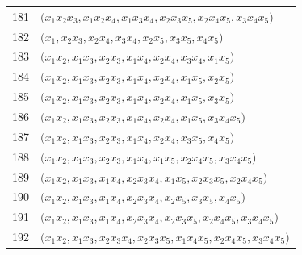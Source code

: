{\begin{longtable}{@{}r>{\raggedright\arraybackslash}p{}@{}}
181 & \(\bigl(x_{1}x_{2}x_{3},\allowbreak x_{1}x_{2}x_{4},\allowbreak x_{1}x_{3}x_{4},\allowbreak x_{2}x_{3}x_{5},\allowbreak x_{2}x_{4}x_{5},\allowbreak x_{3}x_{4}x_{5}\bigr)\) \\
182 & \(\bigl(x_{1},\allowbreak x_{2}x_{3},\allowbreak x_{2}x_{4},\allowbreak x_{3}x_{4},\allowbreak x_{2}x_{5},\allowbreak x_{3}x_{5},\allowbreak x_{4}x_{5}\bigr)\) \\
183 & \(\bigl(x_{1}x_{2},\allowbreak x_{1}x_{3},\allowbreak x_{2}x_{3},\allowbreak x_{1}x_{4},\allowbreak x_{2}x_{4},\allowbreak x_{3}x_{4},\allowbreak x_{1}x_{5}\bigr)\) \\
184 & \(\bigl(x_{1}x_{2},\allowbreak x_{1}x_{3},\allowbreak x_{2}x_{3},\allowbreak x_{1}x_{4},\allowbreak x_{2}x_{4},\allowbreak x_{1}x_{5},\allowbreak x_{2}x_{5}\bigr)\) \\
185 & \(\bigl(x_{1}x_{2},\allowbreak x_{1}x_{3},\allowbreak x_{2}x_{3},\allowbreak x_{1}x_{4},\allowbreak x_{2}x_{4},\allowbreak x_{1}x_{5},\allowbreak x_{3}x_{5}\bigr)\) \\
186 & \(\bigl(x_{1}x_{2},\allowbreak x_{1}x_{3},\allowbreak x_{2}x_{3},\allowbreak x_{1}x_{4},\allowbreak x_{2}x_{4},\allowbreak x_{1}x_{5},\allowbreak x_{3}x_{4}x_{5}\bigr)\) \\
187 & \(\bigl(x_{1}x_{2},\allowbreak x_{1}x_{3},\allowbreak x_{2}x_{3},\allowbreak x_{1}x_{4},\allowbreak x_{2}x_{4},\allowbreak x_{3}x_{5},\allowbreak x_{4}x_{5}\bigr)\) \\
188 & \(\bigl(x_{1}x_{2},\allowbreak x_{1}x_{3},\allowbreak x_{2}x_{3},\allowbreak x_{1}x_{4},\allowbreak x_{1}x_{5},\allowbreak x_{2}x_{4}x_{5},\allowbreak x_{3}x_{4}x_{5}\bigr)\) \\
189 & \(\bigl(x_{1}x_{2},\allowbreak x_{1}x_{3},\allowbreak x_{1}x_{4},\allowbreak x_{2}x_{3}x_{4},\allowbreak x_{1}x_{5},\allowbreak x_{2}x_{3}x_{5},\allowbreak x_{2}x_{4}x_{5}\bigr)\) \\
190 & \(\bigl(x_{1}x_{2},\allowbreak x_{1}x_{3},\allowbreak x_{1}x_{4},\allowbreak x_{2}x_{3}x_{4},\allowbreak x_{2}x_{5},\allowbreak x_{3}x_{5},\allowbreak x_{4}x_{5}\bigr)\) \\
191 & \(\bigl(x_{1}x_{2},\allowbreak x_{1}x_{3},\allowbreak x_{1}x_{4},\allowbreak x_{2}x_{3}x_{4},\allowbreak x_{2}x_{3}x_{5},\allowbreak x_{2}x_{4}x_{5},\allowbreak x_{3}x_{4}x_{5}\bigr)\) \\
192 & \(\bigl(x_{1}x_{2},\allowbreak x_{1}x_{3},\allowbreak x_{2}x_{3}x_{4},\allowbreak x_{2}x_{3}x_{5},\allowbreak x_{1}x_{4}x_{5},\allowbreak x_{2}x_{4}x_{5},\allowbreak x_{3}x_{4}x_{5}\bigr)\) \\

\end{longtable}}
